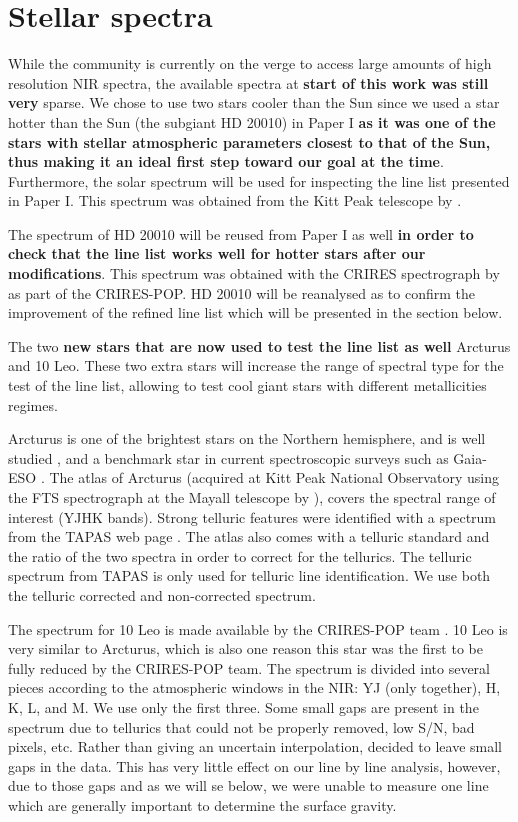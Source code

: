\documentclass{aa}
\begin{document}
\section{Stellar spectra}
\label{sec:data}

While the community is currently on the verge to access large amounts of high resolution NIR
spectra, the available spectra at {\bf start of this work was still very} sparse. We chose to use
two stars cooler than the Sun since we used a star hotter than the Sun (the subgiant HD 20010) in
Paper I {\bf as it was one of the stars with stellar atmospheric parameters closest to that of the
Sun, thus making it an ideal first step toward our goal at the time}. Furthermore, the solar
spectrum will be used for inspecting the line list presented in Paper I. This spectrum was obtained
from the Kitt Peak telescope by \citet{Hinkle1995}.

The spectrum of HD 20010 will be reused from Paper I as well {\bf in order to check that the line
list works well for hotter stars after our modifications}. This spectrum was obtained with the
CRIRES spectrograph by \citet{Lebzelter2012} as part of the CRIRES-POP. HD 20010 will be reanalysed
as to confirm the improvement of the refined line list which will be presented in the section below.

The two {\bf new stars that are now used to test the line list as well} Arcturus and 10 Leo. These
two extra stars will increase the range of spectral type for the test of the line list, allowing to
test cool giant stars with different metallicities regimes.

Arcturus is one of the brightest stars on the Northern hemisphere, and is well
studied \citep[see e.g.][to mention just a
few]{Griffin1967,McWilliam1990,Ramirez2013}, and a benchmark star in
current spectroscopic surveys such as Gaia-ESO \citep{Jofre2014,Smiljanic2014}.
The atlas of Arcturus (acquired at Kitt Peak National Observatory using the FTS
spectrograph at the Mayall telescope by \citet{Hinkle1995a}), covers the
spectral range of interest (YJHK bands). Strong telluric features were
identified with a spectrum from the TAPAS web page \citep{Bertaux2014}. The
atlas also comes with a telluric standard and the ratio of the two spectra in
order to correct for the tellurics. The telluric spectrum from TAPAS is only
used for telluric line identification. We use both the telluric corrected and
non-corrected spectrum.

The spectrum for 10 Leo is made available by the CRIRES-POP team
\citep{Nicholls2017}. 10 Leo is very similar to Arcturus, which is also one
reason this star was the first to be fully reduced by the CRIRES-POP team. The
spectrum is divided into several pieces according to the atmospheric windows in
the NIR: YJ (only together), H, K, L, and M. We use only the first three. Some
small gaps are present in the spectrum due to tellurics that could not be
properly removed, low S/N, bad pixels, etc. Rather than giving an uncertain
interpolation, \citet{Nicholls2017} decided to leave small gaps in the data.
This has very little effect on our line by line analysis, however, due to those
gaps and as we will se below, we were unable to measure one  line which are generally
important to determine the surface gravity.
\end{document}
